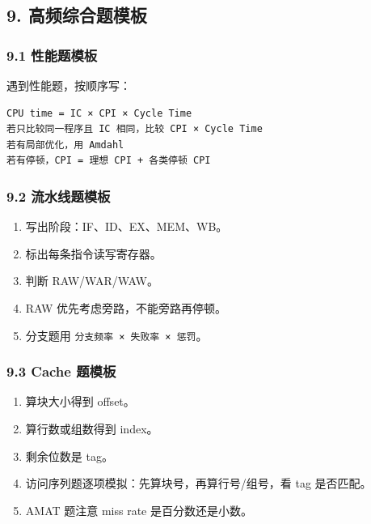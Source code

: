 \documentclass[
]{ctexart}
\newcommand{\passthrough}[1]{#1}
\providecommand{\tightlist}{%
  \setlength{\itemsep}{0pt}\setlength{\parskip}{0pt}}
\begin{document}
\subsection{9.
高频综合题模板}\label{ux9ad8ux9891ux7efcux5408ux9898ux6a21ux677f}

\subsubsection{9.1 性能题模板}\label{ux6027ux80fdux9898ux6a21ux677f}

遇到性能题，按顺序写：

\begin{lstlisting}
CPU time = IC × CPI × Cycle Time
若只比较同一程序且 IC 相同，比较 CPI × Cycle Time
若有局部优化，用 Amdahl
若有停顿，CPI = 理想 CPI + 各类停顿 CPI
\end{lstlisting}

\subsubsection{9.2
流水线题模板}\label{ux6d41ux6c34ux7ebfux9898ux6a21ux677f}

\begin{enumerate}
\def\labelenumi{\arabic{enumi}.}
\tightlist
\item
  写出阶段：IF、ID、EX、MEM、WB。
\item
  标出每条指令读写寄存器。
\item
  判断 RAW/WAR/WAW。
\item
  RAW 优先考虑旁路，不能旁路再停顿。
\item
  分支题用 \passthrough{\lstinline!分支频率 × 失败率 × 惩罚!}。
\end{enumerate}

\subsubsection{9.3 Cache 题模板}\label{cache-ux9898ux6a21ux677f}

\begin{enumerate}
\def\labelenumi{\arabic{enumi}.}
\tightlist
\item
  算块大小得到 offset。
\item
  算行数或组数得到 index。
\item
  剩余位数是 tag。
\item
  访问序列题逐项模拟：先算块号，再算行号/组号，看 tag 是否匹配。
\item
  AMAT 题注意 miss rate 是百分数还是小数。
\end{enumerate}
\end{document}
